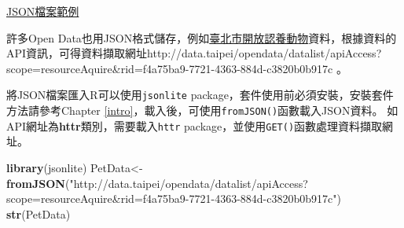 \documentclass[]{book}
\newenvironment{Shaded}{\begin{snugshade}}{\end{snugshade}}
\newcommand{\KeywordTok}[1]{\textcolor[rgb]{0.13,0.29,0.53}{\textbf{{#1}}}}
\newcommand{\StringTok}[1]{\textcolor[rgb]{0.31,0.60,0.02}{{#1}}}
\newcommand{\NormalTok}[1]{{#1}}
\theoremstyle{definition}
\theoremstyle{definition}
\theoremstyle{remark}
\begin{document}
\href{https://api.github.com/users/yijutseng/repos}{JSON檔案範例}

許多Open
Data也用JSON格式儲存，例如\href{http://data.taipei/opendata/datalist/datasetMeta?oid=6a3e862a-e1cb-4e44-b989-d35609559463}{臺北市開放認養動物}資料，根據資料的API資訊，可得資料擷取網址http://data.taipei/opendata/datalist/apiAccess?scope=resourceAquire\&rid=f4a75ba9-7721-4363-884d-c3820b0b917c
。

將JSON檔案匯入R可以使用\texttt{jsonlite}\citep{R-jsonlite}
package，套件使用前必須安裝，安裝套件方法請參考Chapter
\ref{intro}，載入後，可使用\texttt{fromJSON()}函數載入JSON資料。
如API網址為\textbf{httr}類別，需要載入\texttt{httr}\citep{Rhttr}
package，並使用\texttt{GET()}函數處理資料擷取網址。

\begin{Shaded}
\begin{Highlighting}[]
\KeywordTok{library}\NormalTok{(jsonlite)}
\NormalTok{PetData<-}\KeywordTok{fromJSON}\NormalTok{(}\StringTok{"http://data.taipei/opendata/datalist/apiAccess?scope=resourceAquire&rid=f4a75ba9-7721-4363-884d-c3820b0b917c"}\NormalTok{)}
\KeywordTok{str}\NormalTok{(PetData)}
\end{Highlighting}
\end{Shaded}
\end{document}
